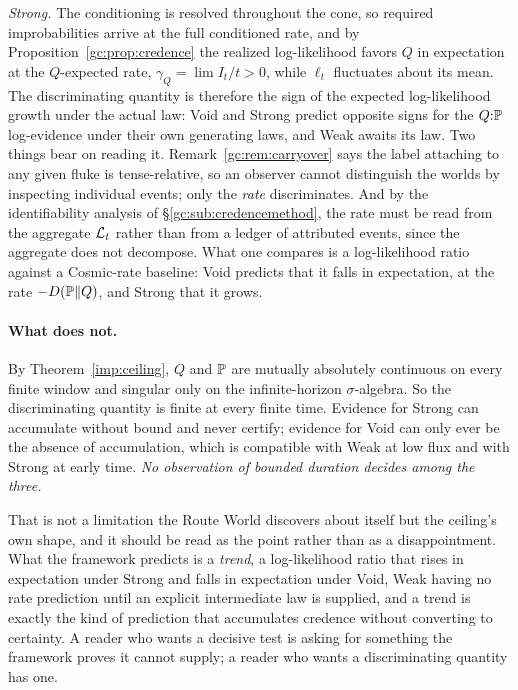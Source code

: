 \emph{Strong.} The conditioning is resolved throughout the cone, so
required improbabilities arrive at the full conditioned rate, and by
Proposition~\ref{gc:prop:credence} the realized log-likelihood favors
$Q$ in expectation at the $Q$-expected rate, $\gamma_Q=\lim I_t/t>0$, while
$\ell_t$ fluctuates about its mean. The discriminating quantity is therefore the sign of the expected
log-likelihood growth under the actual law: Void and Strong predict
opposite signs for the $Q{:}\mathbb{P}$ log-evidence under their own
generating laws, and Weak awaits its law. Two things bear on reading it.
Remark~\ref{gc:rem:carryover} says the label attaching to any given fluke
is tense-relative, so an observer cannot distinguish the worlds by
inspecting individual events; only the \emph{rate} discriminates. And by
the identifiability analysis of \S\ref{gc:sub:credencemethod}, the rate
must be read from the aggregate $\mathcal{L}_t$ rather than from a ledger of
attributed events, since the aggregate does not decompose. What one
compares is a log-likelihood ratio against a Cosmic-rate baseline: Void
predicts that it falls in expectation, at the rate $-D(\mathbb{P}\|Q)$, and
Strong that it grows.

\paragraph{What does not.} By Theorem~\ref{imp:ceiling}, $Q$ and $\mathbb{P}$
are mutually absolutely continuous on every finite window and singular
only on the infinite-horizon $\sigma$-algebra. So the discriminating
quantity is finite at every finite time. Evidence for Strong can
accumulate without bound and never certify; evidence for Void can only
ever be the absence of accumulation, which is compatible with Weak at low
flux and with Strong at early time. \emph{No observation of bounded
duration decides among the three.}

That is not a limitation the Route World discovers about itself but the
ceiling's own shape, and it should be read as the point rather than as a
disappointment. What the framework predicts is a \emph{trend}, a
log-likelihood ratio that rises in expectation under Strong and falls in
expectation under Void, Weak having no rate prediction until an explicit
intermediate law is supplied, and a trend is exactly the kind of
prediction that accumulates credence without converting to certainty. A
reader who wants a decisive test is asking for something the framework
proves it cannot supply; a reader who wants a discriminating quantity has
one.

